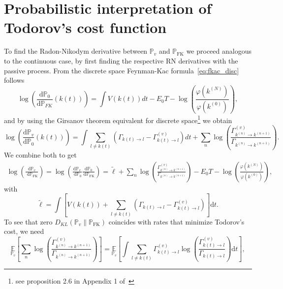 \section{Probabilistic interpretation of Todorov's cost function}
\label{app:todorov-prob}
To find the Radon-Nikodym derivative between $\mathbb{P}_v$ and $\mathbb{P}_{\mathrm{FK}}$ we proceed analogous to the continuous case, by first finding the respective RN derivatives with the passive process. From the discrete space Feynman-Kac formula~\eqref{eq:fkac_disc} follows
\begin{equation}
	\log \left(\frac{\mathrm{d} \mathbb{P}_{0}}{\mathrm{d} \mathbb{P}_{F K}}(k(t))\right)=\int V(k(t)) d t-E_{0} T-\log \left(\frac{\varphi(k^{(N)})}{\varphi(k^{(0)})}\right),
\end{equation}
and by using the Girsanov theorem equivalent for discrete space\footnote{see proposition 2.6 in Appendix 1 of~\cite{kipnis1998scaling}} we obtain
\begin{equation}
	\log \left(\frac{\mathrm{d} \mathbb{P}_{v}}{\mathrm{d} \mathbb{P}_{0}}(k(t))\right)
	=
	\int \sum_{l \neq k(t)}\left(\Gamma_{k(t) \rightarrow l}-\Gamma_{k(t) \rightarrow l}^{(v)}\right) d t+\sum_{n} \log \left(\frac{\Gamma_{k^{(n)} \rightarrow k^{(n+1)}}^{(v)}}{\Gamma_{k^{(n)} \rightarrow k^{(n+1)}}}\right).
\end{equation}
We combine both to get
\begin{equation}
	\begin{aligned}
	\log \left(\frac{\mathrm{d} \mathbb{P}_{v}}{\mathrm{~d} \mathbb{P}_{\mathrm{FK}}}\right)
	=
	\log \left(\frac{\mathrm{d} \mathbb{P}_{v}}{\mathrm{~d} \mathbb{P}_{0}} \frac{\mathrm{d} \mathbb{P}_{0}}{\mathrm{~d} \mathbb{P}_{\mathrm{FK}}}\right)
	= \tilde \ell
	+\sum_{n} \log \left(\frac{\Gamma_{k^{(n)} \rightarrow k^{(n+1)}}^{(v)}}{\Gamma_{k^{(n)} \rightarrow k^{(n+1)}}}\right)-E_{0} T-\log \left(\frac{\varphi(k^{(N)})}{\varphi(k^{(0)})}\right),
	\end{aligned}
\end{equation}
with
\begin{equation}
	\tilde \ell = \int \left[V(k(t))+\sum_{l \neq k(t)}\left(\Gamma_{k(t) \rightarrow l}-\Gamma_{k(t) \rightarrow l}^{(v)}\right)\right] \mathrm{d}t.
\end{equation}
To see that zero $D_{K L}\left(\mathbb{P}_{v} \| \mathbb{P}_{\mathrm{F K}}\right)$ coincides with rates that minimize Todorov's cost, we need
\begin{equation}
	\underset{\mathbb{P}_v}{\mathbb{E}}
	\left[
	\sum_{n} \log \left(\frac{\Gamma_{k^{(n)} \rightarrow k^{(n+1)}}^{(v)}}{\Gamma_{k^{(n)} \rightarrow k^{(n+1)}}}\right)
	\right]
	= 
	\underset{\mathbb{P}_v}{\mathbb{E}} 
	\left[
	\int 
	\sum_{l \neq k(t)}
	\Gamma_{k(t) \rightarrow l}^{(v)} \log \left(\frac{\Gamma_{k(t) \rightarrow l}^{(v)}}{\Gamma_{k(t) \rightarrow l}}\right) \mathrm{d} t
	\right],
\end{equation}
